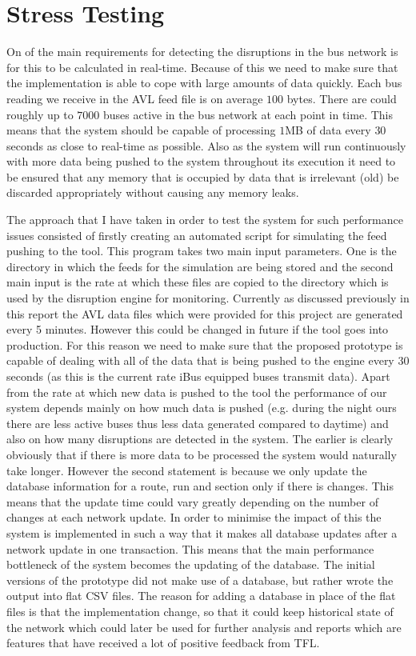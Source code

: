 \section{Stress Testing}
On of the main requirements for detecting the disruptions in the bus network is for this to be calculated in real-time. Because of this we need to make sure that the implementation is able to cope with large amounts of data quickly. Each bus reading we receive in the AVL feed file is on average $100$ bytes. There are could roughly up to $7000$ buses active in the bus network at each point in time. This means that the system should be capable of processing $1$MB of data every $30$ seconds as close to real-time as possible. Also as the system will run continuously with more data being pushed to the system throughout its execution it need to be ensured that any memory that is occupied by data that is irrelevant (old) be discarded appropriately without causing any memory leaks. 

The approach that I have taken in order to test the system for such performance issues consisted of firstly creating an automated script for simulating the feed pushing to the tool. This program takes two main input parameters. One is the directory in which the feeds for the simulation are being stored and the second main input is the rate at which these files are copied to the directory which is used by the disruption engine for monitoring. Currently as discussed previously in this report the AVL data files which were provided for this project are generated every 5 minutes. However this could be changed in future if the tool goes into production. For this reason we need to make sure that the proposed prototype is capable of dealing with all of the data that is being pushed to the engine every 30 seconds (as this is the current rate iBus equipped buses transmit data). Apart from the rate at which new data is pushed to the tool the performance of our system depends mainly on how much data is pushed (e.g. during the night ours there are less active buses thus less data generated compared to daytime) and also on how many disruptions are detected in the system. The earlier is clearly obviously that if there is more data to be processed the system would naturally take longer. However the second statement is because we only update the database information for a route, run and section only if there is changes. This means that the update time could vary greatly depending on the number of changes at each network update. In order to minimise the impact of this the system is implemented in such a way that it makes all database updates after a network update in one transaction. This means that the main performance bottleneck of the system becomes the updating of the database. The initial versions of the prototype did not make use of a database, but rather wrote the output into flat CSV files. The reason for adding a database in place of the flat files is that the implementation change, so that it could keep historical state of the network which could later be used for further analysis and reports which are features that have received a lot of positive feedback from TFL.

